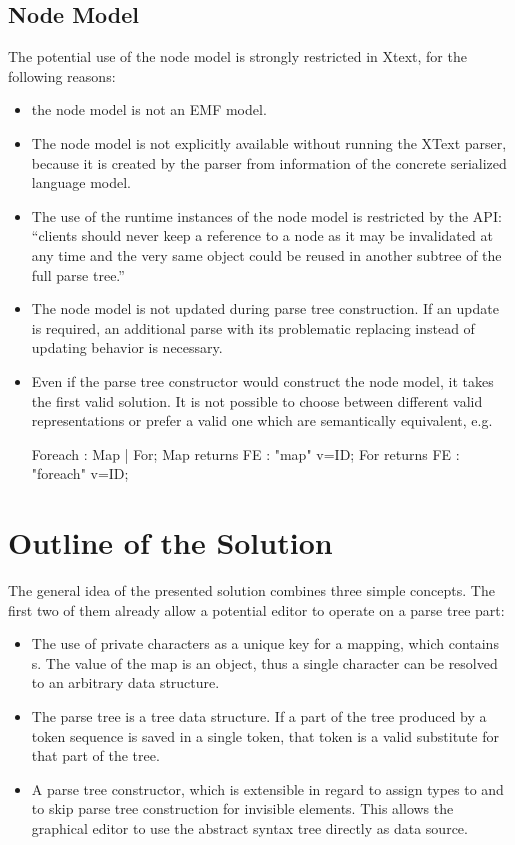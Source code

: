 \subsection{Node Model}
The potential use of the node model is strongly restricted in Xtext, for the following reasons:
\begin{itemize}
	\item the node model is not an EMF model. 
	\item The node model is not explicitly available without running the XText parser, because it is created by the parser from information of the concrete serialized language model. 
	\item The use of the runtime instances of the node model is restricted by the API: ``clients should never keep a reference to a node as it may be invalidated at any time and the very same object could be reused in another subtree of the full parse tree.''\cite{XTextAPI}
	\item The node model is not updated during parse tree construction. If an update is required, an additional parse with its problematic replacing instead of updating behavior is necessary.
	\item Even if the parse tree constructor would construct the node model, it takes the first valid solution. It is not possible to choose between different valid representations or prefer a valid one which are semantically equivalent, e.g.
\begin{xtxt}
Foreach 		: 	Map | For;
Map returns FE  	:  	"map" 		v=ID;
For returns FE  	: 	"foreach"	v=ID;
\end{xtxt}
\end{itemize}


\section{Outline of the Solution}
The general idea of the presented solution combines three simple concepts. The first two of them already allow a potential editor to operate on a parse tree part:
\begin{itemize}
	\item The use of private characters as a unique key for a mapping, which contains s. The value of the map is an object, thus a single character can be resolved to an arbitrary data structure.
	\item The parse tree is a tree data structure. If a part of the tree produced by a token sequence is saved in a single token, that token is a valid substitute for that part of the tree.
	\item A parse tree constructor, which is extensible in regard to assign types to and to skip parse tree construction for invisible elements. This allows the graphical editor to use the abstract syntax tree directly as data source. 
\end{itemize}

